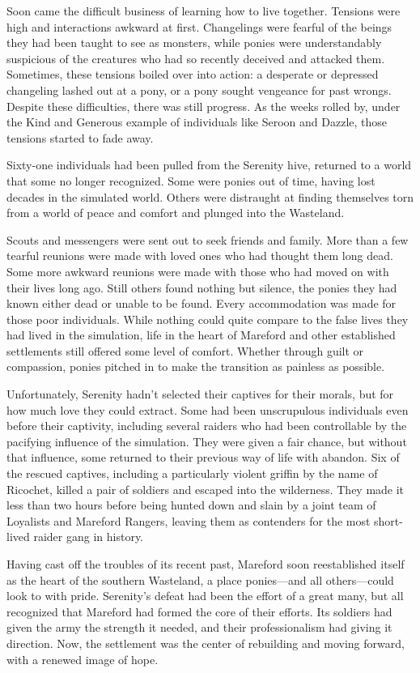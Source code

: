 Soon came the difficult business of learning how to live together. Tensions were high and interactions awkward at first. Changelings were fearful of the beings they had been taught to see as monsters, while ponies were understandably suspicious of the creatures who had so recently deceived and attacked them. Sometimes, these tensions boiled over into action: a desperate or depressed changeling lashed out at a pony, or a pony sought vengeance for past wrongs. Despite these difficulties, there was still progress. As the weeks rolled by, under the Kind and Generous example of individuals like Seroon and Dazzle, those tensions started to fade away.

{\br}%
Sixty-one individuals had been pulled from the Serenity hive, returned to a world that some no longer recognized. Some were ponies out of time, having lost decades in the simulated world. Others were distraught at finding themselves torn from a world of peace and comfort and plunged into the Wasteland.

Scouts and messengers were sent out to seek friends and family. More than a few tearful reunions were made with loved ones who had thought them long dead. Some more awkward reunions were made with those who had moved on with their lives long ago. Still others found nothing but silence, the ponies they had known either dead or unable to be found. Every accommodation was made for those poor individuals. While nothing could quite compare to the false lives they had lived in the simulation, life in the heart of Mareford and other established settlements still offered some level of comfort. Whether through guilt or compassion, ponies pitched in to make the transition as painless as possible.

Unfortunately, Serenity hadn’t selected their captives for their morals, but for how much love they could extract. Some had been unscrupulous individuals even before their captivity, including several raiders who had been controllable by the pacifying influence of the simulation. They were given a fair chance, but without that influence, some returned to their previous way of life with abandon. Six of the rescued captives, including a particularly violent griffin by the name of Ricochet, killed a pair of soldiers and escaped into the wilderness. They made it less than two hours before being hunted down and slain by a joint team of Loyalists and Mareford Rangers, leaving them as contenders for the most short-lived raider gang in history.

{\br}%
Having cast off the troubles of its recent past, Mareford soon reestablished itself as the heart of the southern Wasteland, a place ponies—and all others—could look to with pride. Serenity’s defeat had been the effort of a great many, but all recognized that Mareford had formed the core of their efforts. Its soldiers had given the army the strength it needed, and their professionalism had giving it direction. Now, the settlement was the center of rebuilding and moving forward, with a renewed image of hope.

